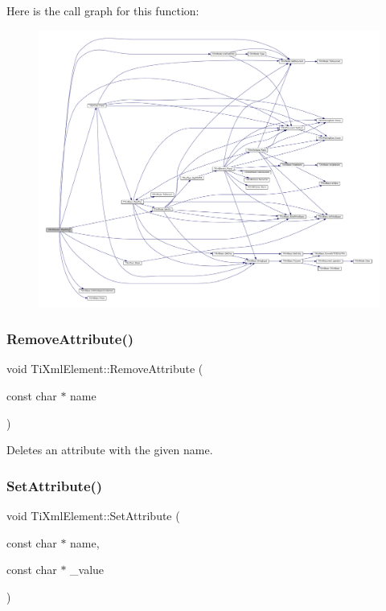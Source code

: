 Here is the call graph for this function\+:
\nopagebreak
\begin{figure}[H]
\begin{center}
\leavevmode
\includegraphics[width=350pt]{class_ti_xml_element_ac786bce103042d3837c4cc2ff6967d41_cgraph}
\end{center}
\end{figure}
\mbox{\label{class_ti_xml_element_a56979767deca794376b1dfa69a525b2a}} 
\subsubsection{\texorpdfstring{Remove\+Attribute()}{RemoveAttribute()}}
{\footnotesize\ttfamily void Ti\+Xml\+Element\+::\+Remove\+Attribute (\begin{DoxyParamCaption}\item[{const char $\ast$}]{name }\end{DoxyParamCaption})}

Deletes an attribute with the given name. \mbox{\label{class_ti_xml_element_abf0b3bd7f0e4c746a89ec6e7f101fc32}} 
\subsubsection{\texorpdfstring{Set\+Attribute()}{SetAttribute()}\hspace{0.1cm}{\footnotesize\ttfamily [1/2]}}
{\footnotesize\ttfamily void Ti\+Xml\+Element\+::\+Set\+Attribute (\begin{DoxyParamCaption}\item[{const char $\ast$}]{name,  }\item[{const char $\ast$}]{\+\_\+value }\end{DoxyParamCaption})}


